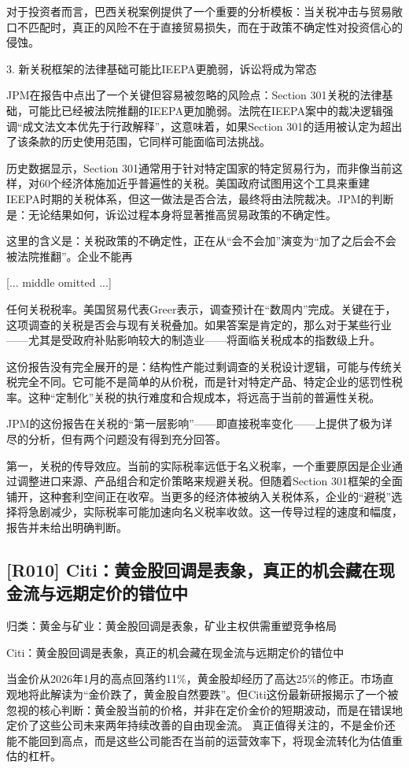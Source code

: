 \documentclass[11pt]{ctexart}
\begin{document}
对于投资者而言，巴西关税案例提供了一个重要的分析模板：当关税冲击与贸易敞口不匹配时，真正的风险不在于直接贸易损失，而在于政策不确定性对投资信心的侵蚀。

3. 新关税框架的法律基础可能比IEEPA更脆弱，诉讼将成为常态

JPM在报告中点出了一个关键但容易被忽略的风险点：Section 301关税的法律基础，可能比已经被法院推翻的IEEPA更加脆弱。法院在IEEPA案中的裁决逻辑强调“成文法文本优先于行政解释”，这意味着，如果Section 301的适用被认定为超出了该条款的历史使用范围，它同样可能面临司法挑战。

历史数据显示，Section 301通常用于针对特定国家的特定贸易行为，而非像当前这样，对60个经济体施加近乎普遍性的关税。美国政府试图用这个工具来重建IEEPA时期的关税体系，但这一做法是否合法，最终将由法院裁决。JPM的判断是：无论结果如何，诉讼过程本身将显著推高贸易政策的不确定性。

这里的含义是：关税政策的不确定性，正在从“会不会加”演变为“加了之后会不会被法院推翻”。企业不能再

[... middle omitted ...]

任何关税税率。美国贸易代表Greer表示，调查预计在“数周内”完成。关键在于，这项调查的关税是否会与现有关税叠加。如果答案是肯定的，那么对于某些行业——尤其是受政府补贴影响较大的制造业——将面临关税成本的指数级上升。

这份报告没有完全展开的是：结构性产能过剩调查的关税设计逻辑，可能与传统关税完全不同。它可能不是简单的从价税，而是针对特定产品、特定企业的惩罚性税率。这种“定制化”关税的执行难度和合规成本，将远高于当前的普遍性关税。

JPM的这份报告在关税的“第一层影响”——即直接税率变化——上提供了极为详尽的分析，但有两个问题没有得到充分回答。

第一，关税的传导效应。当前的实际税率远低于名义税率，一个重要原因是企业通过调整进口来源、产品组合和定价策略来规避关税。但随着Section 301框架的全面铺开，这种套利空间正在收窄。当更多的经济体被纳入关税体系，企业的“避税”选择将急剧减少，实际税率可能加速向名义税率收敛。这一传导过程的速度和幅度，报告并未给出明确判断。

\subsection{[R010] Citi：黄金股回调是表象，真正的机会藏在现金流与远期定价的错位中}
{\small\color{refgray}归类：黄金与矿业：黄金股回调是表象，矿业主权供需重塑竞争格局}

Citi：黄金股回调是表象，真正的机会藏在现金流与远期定价的错位中

当金价从2026年1月的高点回落约11\%，黄金股却经历了高达25\%的修正。市场直观地将此解读为“金价跌了，黄金股自然要跌”。但Citi这份最新研报揭示了一个被忽视的核心判断：黄金股当前的价格，并非在定价金价的短期波动，而是在错误地定价了这些公司未来两年持续改善的自由现金流。 真正值得关注的，不是金价还能不能回到高点，而是这些公司能否在当前的运营效率下，将现金流转化为估值重估的杠杆。
\end{document}
